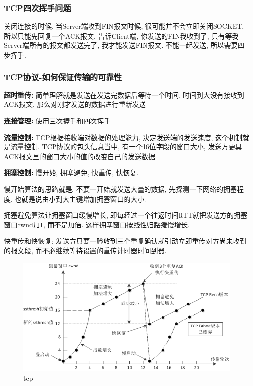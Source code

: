 \subsubsection{TCP四次挥手问题}
关闭连接的时候, 当Server端收到FIN报文时候, 很可能并不会立即关闭SOCKET, 所以只能先回复一个ACK报文, 告诉Client端, 你发送的FIN我收到了, 只有等我Server端所有的报文都发送完了, 我才能发送FIN报文. 不能一起发送, 所以需要四步挥手.
\subsubsection{TCP协议-如何保证传输的可靠性}
\textbf{超时重传:} 简单理解就是发送在发送完数据后等待一个时间, 时间到大没有接收到ACK报文, 那么对刚才发送的数据进行重新发送
\par
\textbf{连接管理:} 使用三次握手和四次挥手
\par
\textbf{流量控制:} TCP根据接收端对数据的处理能力, 决定发送端的发送速度, 这个机制就是流量控制. TCP协议的包头信息当中, 有一个16位字段的窗口大小, 发送方更具ACK报文里的窗口大小的值的改变自己的发送数据
\par
\textbf{拥塞控制:} 慢开始, 拥塞避免, 快重传, 快恢复.
\par
慢开始算法的思路就是, 不要一开始就发送大量的数据, 先探测一下网络的拥塞程度, 也就是说由小到大主键增加拥塞窗口的大小.
\par
拥塞避免算法让拥塞窗口缓慢增长, 即每经过一个往返时间RTT就把发送方的拥塞窗口cwnd加1, 而不是加倍. 这样拥塞窗口按线性归路缓慢增长.
\par
快重传和快恢复: 发送方只要一脸收到三个重复确认就引动立即重传对方尚未收到的报文段, 而不必继续等待设置的重传计时器时间到器.
\begin{figure}
	\centering
	\includegraphics[width=0.7\linewidth]{figures/tcp.png}
	\caption{tcp}
	\label{fig:tcp}
\end{figure}
